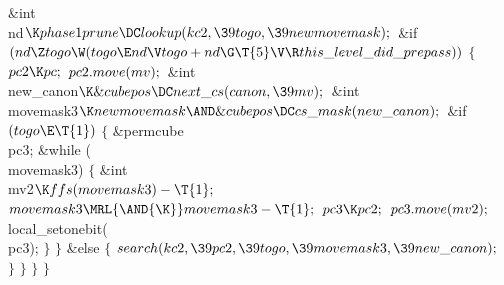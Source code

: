\&{int} \\{nd}${}\K\\{phase1prune}\DC\\{lookup}(\\{kc2},\39\\{togo},\39%
\\{newmovemask});{}$\7
\&{if} ${}(\\{nd}\Z\\{togo}\W(\\{togo}\E\\{nd}\V\\{togo}+\\{nd}\G\T{5}\V\R%
\\{this\_level\_did\_prepass})){}$\5
${}\{{}$\1\6
${}\\{pc2}\K\\{pc};{}$\6
${}\\{pc2}.\\{move}(\\{mv});{}$\7
\&{int} \\{new\_canon}${}\K\&{cubepos}\DC\\{next\_cs}(\\{canon},\39\\{mv});{}$\6
\&{int} \\{movemask3}${}\K\\{newmovemask}\AND\&{cubepos}\DC\\{cs\_mask}(\\{new%
\_canon});{}$\7
\&{if} ${}(\\{togo}\E\T{1}){}$\5
${}\{{}$\1\6
\&{permcube} \\{pc3};\7
\&{while} (\\{movemask3})\5
${}\{{}$\1\6
\&{int} \\{mv2}${}\K\\{ffs}(\\{movemask3})-\T{1};{}$\7
${}\\{movemask3}\MRL{\AND{\K}}\\{movemask3}-\T{1};{}$\6
${}\\{pc3}\K\\{pc2};{}$\6
${}\\{pc3}.\\{move}(\\{mv2});{}$\6
\\{local\_setonebit}(\\{pc3});\6
\4${}\}{}$\2\6
\4${}\}{}$\2\6
\&{else}\5
${}\{{}$\1\6
${}\\{search}(\\{kc2},\39\\{pc2},\39\\{togo},\39\\{movemask3},\39\\{new%
\_canon});{}$\6
\4${}\}{}$\2\6
\4${}\}{}$\2\6
\4${}\}{}$\2\6
\4${}\}{}$\2\par
\fi

